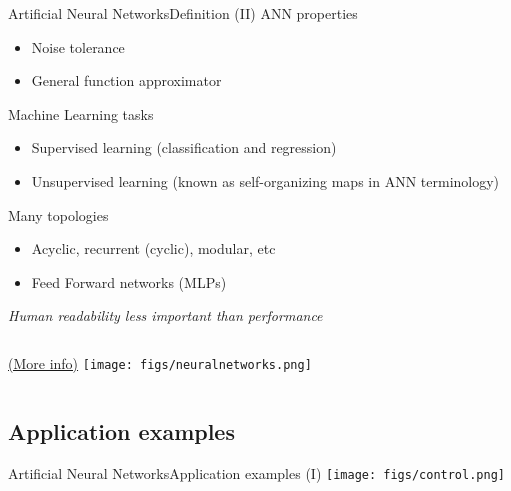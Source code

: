 \documentclass[10pt,compress]{beamer} %
\begin{document}

\begin{frame}{Artificial Neural Networks}{Definition (II)}
	ANN properties
	\begin{itemize}
	\item Noise tolerance
	\item General function approximator
	\end{itemize}

	Machine Learning tasks
	\begin{itemize}
	\item Supervised learning (classification and regression)
	\item Unsupervised learning (known as \alert{self-organizing maps} in ANN terminology)
	\end{itemize}

	Many topologies
	\begin{itemize}
		\item Acyclic, recurrent (cyclic), modular, etc
		\item Feed Forward networks (MLPs)
	\end{itemize}

	\centering \textit{Human readability less important than performance}
\end{frame}

\begin{frame}[plain]{}{}
\vspace{-0.2cm}
\begin{center}
    \begin{columns}
	\href{http://www.asimovinstitute.org/neural-network-zoo/}{(More info)}
	\texttt{[image: figs/neuralnetworks.png]}
	\end{columns}
\end{center}
\end{frame}

\subsection{Application examples}
\begin{frame}{Artificial Neural Networks}{Application examples (I)}
	\centering\texttt{[image: figs/control.png]}
\end{frame}
\end{document}
